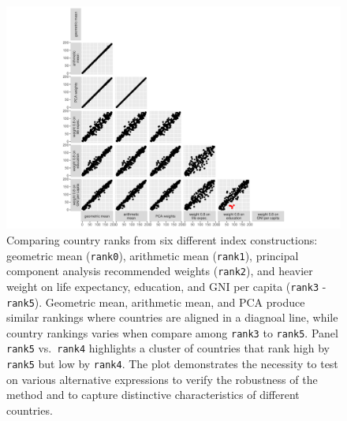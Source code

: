 \documentclass[
]{interact}
\begin{document}
\begin{figure}

{\centering \includegraphics{tidyindex_files/figure-pdf/fig-hdi-expr-1.pdf}

}

\caption{\label{fig-hdi-expr}Comparing country ranks from six different
index constructions: geometric mean (\texttt{rank0}), arithmetic mean
(\texttt{rank1}), principal component analysis recommended weights
(\texttt{rank2}), and heavier weight on life expectancy, education, and
GNI per capita (\texttt{rank3} - \texttt{rank5}). Geometric mean,
arithmetic mean, and PCA produce similar rankings where countries are
aligned in a diagnoal line, while country rankings varies when compare
among \texttt{rank3} to \texttt{rank5}. Panel \texttt{rank5}
vs.~\texttt{rank4} highlights a cluster of countries that rank high by
\texttt{rank5} but low by \texttt{rank4}. The plot demonstrates the
necessity to test on various alternative expressions to verify the
robustness of the method and to capture distinctive characteristics of
different countries.}

\end{figure}
\end{document}
